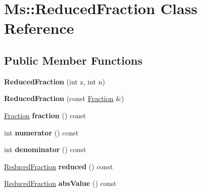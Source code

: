 \hypertarget{class_ms_1_1_reduced_fraction}{}\section{Ms\+:\+:Reduced\+Fraction Class Reference}
\label{class_ms_1_1_reduced_fraction}
\subsection*{Public Member Functions}
\begin{DoxyCompactItemize}
\item 
\mbox{\label{class_ms_1_1_reduced_fraction_a1760c2ba5b3455288c522e7207e09218}} 
{\bfseries Reduced\+Fraction} (int z, int n)
\item 
\mbox{\label{class_ms_1_1_reduced_fraction_aa3a652699d2444ed9adc7c91d3385559}} 
{\bfseries Reduced\+Fraction} (const \hyperlink{class_ms_1_1_fraction}{Fraction} \&)
\item 
\mbox{\label{class_ms_1_1_reduced_fraction_a5cc1f40427b335884035d64f3944977e}} 
\hyperlink{class_ms_1_1_fraction}{Fraction} {\bfseries fraction} () const
\item 
\mbox{\label{class_ms_1_1_reduced_fraction_ac86b64648ec6b1d630cd1f428e07101b}} 
int {\bfseries numerator} () const
\item 
\mbox{\label{class_ms_1_1_reduced_fraction_ac9d6fc61dd260373661fa59f7d159e4a}} 
int {\bfseries denominator} () const
\item 
\mbox{\label{class_ms_1_1_reduced_fraction_aa32b052a400f9fc48cc94b5795edd007}} 
\hyperlink{class_ms_1_1_reduced_fraction}{Reduced\+Fraction} {\bfseries reduced} () const
\item 
\mbox{\label{class_ms_1_1_reduced_fraction_aadf16501a3a8508fa74405c3db44866f}} 
\hyperlink{class_ms_1_1_reduced_fraction}{Reduced\+Fraction} {\bfseries abs\+Value} () const
\item 
\mbox{\label{class_ms_1_1_reduced_fraction_a75c73aa398798573e4801242ebc43ae1}} 

\end{DoxyCompactItemize}
